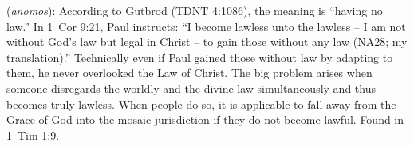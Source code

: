 \item[Lawless,]

(\textit{anomos}):
According to Gutbrod (TDNT 4:1086), the meaning is ``having no law.'' In 1~Cor 9:21, Paul instructs: ``I become lawless unto the lawless -- I am not without God's law but legal in Christ -- to gain those without any law (NA28; my translation).'' Technically even if Paul gained those without law by adapting to them, he never overlooked the Law of Christ. The big problem arises when someone disregards the worldly and the divine law simultaneously and thus becomes truly lawless. When people do so, it is applicable to fall away from the Grace of God into the mosaic jurisdiction if they do not become lawful.
Found in 1~Tim 1:9.
